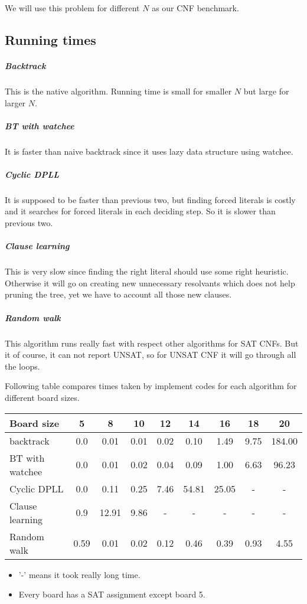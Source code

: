 \documentclass[a4paper]{article}
\begin{document}
We will use this problem for different $N$ as our CNF benchmark.

\subsection{Running times}

\subparagraph{Backtrack}
This is the native algorithm. Running time is small for smaller $N$ but large for larger $N$.

\subparagraph{BT with watchee}
It is faster than naive backtrack since it uses lazy data structure using watchee.

\subparagraph{Cyclic DPLL}
It is supposed to be faster than previous two, but finding forced literals is costly and it searches for forced literals in each deciding step. So it is slower than previous two.

\subparagraph{Clause learning}
This is very slow since finding the right literal should use some right heuristic. Otherwise it will go on creating new unnecessary resolvants which does not help pruning the tree, yet we have to account all those new clauses.

\subparagraph{Random walk}
This algorithm runs really fast with respect other algorithms for SAT CNFs. But it of course, it can not report UNSAT, so for UNSAT CNF it will go through all the loops.

\vspace{1em}

Following table compares times taken by implement codes for each algorithm for different board sizes.
\begin{center}
{
\centering
\begin{tabular}{|l|c|c|c|c|c|c|c|c|}
\hline
Board size & 5 & 8 & 10 & 12 & 14 & 16 & 18 & 20 \\ \hline
backtrack & 0.0 & 0.01 & 0.01 & 0.02 & 0.10 & 1.49 & 9.75 & 184.00 \\ \hline
BT with watchee & 0.0 & 0.01 & 0.02 & 0.04 & 0.09 & 1.00 & 6.63 & 96.23 \\ \hline
Cyclic DPLL & 0.0 & 0.11 & 0.25 & 7.46 & 54.81 & 25.05 & - & - \\ \hline
Clause learning & 0.9 & 12.91 & 9.86 & - & - & - & - & - \\ \hline
Random walk & 0.59 & 0.01 & 0.02 & 0.12 & 0.46 & 0.39 & 0.93 & 4.55 \\ \hline
\end{tabular}
}
\end{center}
\begin{itemize}
\item '-' means it took really long time.
\item Every board has a SAT assignment except board 5.
\end{itemize}
\end{document}

